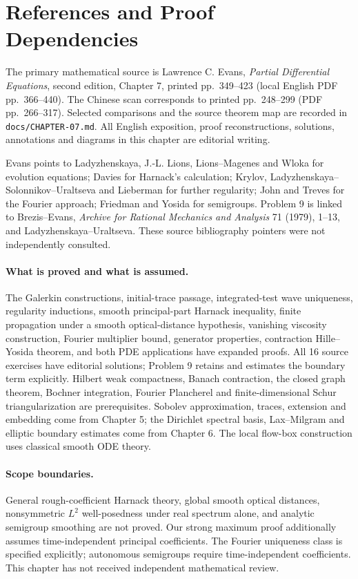 \Needspace{55mm}
\Needspace{55mm}
\section{References and Proof Dependencies}
\label{sec:7-6}
The primary mathematical source is Lawrence C. Evans, \emph{Partial
Differential Equations}, second edition, Chapter 7, printed pp.~349--423
(local English PDF pp.~366--440). The Chinese scan corresponds to printed
pp.~248--299 (PDF pp.~266--317). Selected comparisons and the source theorem
map are recorded in \texttt{docs/CHAPTER-07.md}.
All English exposition, proof reconstructions, solutions, annotations and
diagrams in this chapter are editorial writing.

Evans points to Ladyzhenskaya, J.-L. Lions, Lions--Magenes and Wloka for
evolution equations; Davies for Harnack's calculation; Krylov,
Ladyzhenskaya--Solonnikov--Uraltseva and Lieberman for further regularity;
John and Treves for the Fourier approach; Friedman and Yosida for semigroups.
Problem 9 is linked to Brezis--Evans, \emph{Archive for Rational Mechanics
and Analysis} 71 (1979), 1--13, and Ladyzhenskaya--Uraltseva.
These source bibliography pointers were not independently consulted.

\paragraph{What is proved and what is assumed.}
The Galerkin constructions, initial-trace passage, integrated-test wave
uniqueness, regularity inductions, smooth principal-part Harnack inequality,
finite propagation under a smooth optical-distance hypothesis, vanishing
viscosity construction, Fourier multiplier bound, generator properties,
contraction Hille--Yosida theorem, and both PDE applications have expanded
proofs. All 16 source exercises have editorial solutions; Problem 9 retains
and estimates the boundary term explicitly.
Hilbert weak compactness, Banach contraction, the closed graph theorem,
Bochner integration, Fourier Plancherel and finite-dimensional Schur
triangularization are prerequisites. Sobolev approximation, traces,
extension and embedding come from Chapter 5; the Dirichlet spectral basis,
Lax--Milgram and elliptic boundary estimates come from Chapter 6.
The local flow-box construction uses classical smooth ODE theory.

\paragraph{Scope boundaries.}
General rough-coefficient Harnack theory, global smooth optical distances,
nonsymmetric $L^2$ well-posedness under real spectrum alone, and analytic
semigroup smoothing are not proved. Our strong maximum proof additionally
assumes time-independent principal coefficients. The Fourier uniqueness
class is specified explicitly; autonomous semigroups require time-independent
coefficients. This chapter has not received independent mathematical review.
